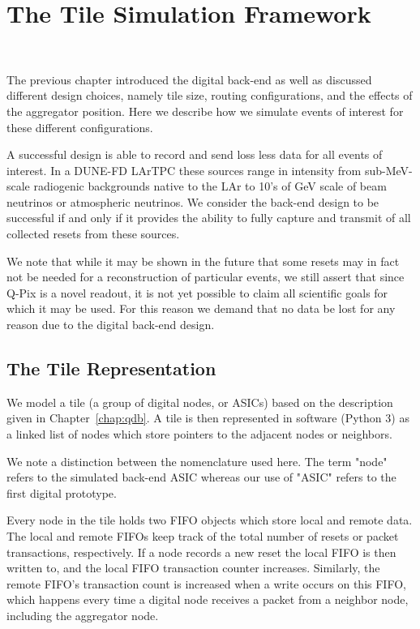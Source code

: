 \section{The Tile Simulation Framework}~\label{sec:tile_simulation}

The previous chapter introduced the digital back-end as well as discussed different design choices, namely tile size, routing configurations, and the effects of the aggregator position.
Here we describe how we simulate events of interest for these different configurations.

A successful design is able to record and send loss less data for all events of interest.
In a DUNE-FD LArTPC these sources range in intensity from sub-MeV-scale radiogenic backgrounds native to the LAr to 10's of GeV scale of beam neutrinos or atmospheric neutrinos.
We consider the back-end design to be successful if and only if it provides the ability to fully capture and transmit of all collected resets from these sources.

We note that while it may be shown in the future that some resets may in fact not be needed for a reconstruction of particular events, we still assert that since Q-Pix is a novel readout, it is not yet possible to claim all scientific goals for which it may be used.
For this reason we demand that no data be lost for any reason due to the digital back-end design.

\subsection{The Tile Representation}

We model a tile (a group of digital nodes, or ASICs) based on the description given in Chapter~\ref{chap:qdb}.
A tile is then represented in software (Python 3) as a linked list of nodes which store pointers to the adjacent nodes or neighbors.

We note a distinction between the nomenclature used here. 
The term "node" refers to the simulated back-end ASIC whereas our use of "ASIC" refers to the first digital prototype.

Every node in the tile holds two FIFO objects which store local and remote data. 
The local and remote FIFOs keep track of the total number of resets or packet transactions, respectively.
If a node records a new reset the local FIFO is then written to, and the local FIFO transaction counter increases.
Similarly, the remote FIFO's transaction count is increased when a write occurs on this FIFO, which happens every time a digital node receives a packet from a neighbor node, including the aggregator node.

